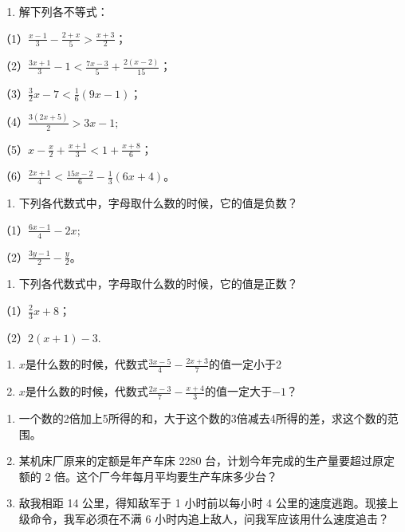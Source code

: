 \begin{enumerate}
\item
  解下列各不等式：
\end{enumerate}

（1）\(\frac{x - 1}{3} - \frac{2 + x}{5} > \frac{x + 3}{2}\)；

（2）\(\frac{3x + 1}{3} - 1 < \frac{7x - 3}{5} + \frac{2(x - 2)}{15}\)；

（3）\(\frac{3}{2} x - 7 < \frac{1}{6} (9x - 1)\)；

（4）\(\frac{3(2x + 5)}{2} > 3x - 1;\)

（5）\(x - \frac{x}{2} + \frac{x + 1}{3} < 1 + \frac{x + 8}{6}\)；

（6）\(\frac{2x + 1}{4} < \frac{15x - 2}{6} - \frac{1}{3}(6x + 4)\)。

\begin{enumerate}[start=2]
\item
  下列各代数式中，字母取什么数的时候，它的值是负数？
\end{enumerate}

（1）\(\frac{6x - 1}{4} - 2x;\)

（2）\(\frac{3y - 1}{2} - \frac{y}{2}\)。

\begin{enumerate}[start=3]
\item
  下列各代数式中，字母取什么数的时候，它的值是正数？
\end{enumerate}

（1）\(\frac{2}{3} x + 8\)；

（2）\(2(x + 1) - 3.\)

\begin{enumerate}[start=4]
\item
  \(x\)是什么数的时候，代数式\(\frac{3x - 5}{4} - \frac{2x + 3}{7}\)的值一定小于2
\item
  \(x\)是什么数的时候，代数式\(\frac{2x - 3}{7} - \frac{x + 4}{3}\)的值一定大于\(-1\)？
\end{enumerate}

\begin{enumerate}[start=6]
\item
  一个数的2倍加上5所得的和，大于这个数的3倍减去4所得的差，求这个数的范围。
\item
  某机床厂原来的定额是年产车床 2280
  台，计划今年完成的生产量要超过原定额的 2
  倍。这个厂今年每月平均要生产车床多少台？
\item
  敌我相距 14 公里，得知敌军于 1 小时前以每小时 4
  公里的速度逃跑。现接上级命令，我军必须在不满 6
  小时内追上敌人，问我军应该用什么速度追击？
\end{enumerate}

